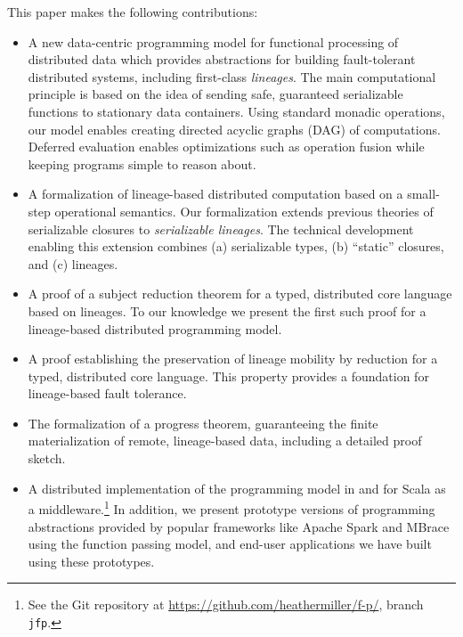 \documentclass{jfp1}
\begin{document}
This paper makes the following contributions:
\begin{itemize}
  \item A new data-centric programming model for functional processing
    of distributed data which provides abstractions for building
    fault-tolerant distributed systems, including first-class {\em
      lineages}. The main computational principle is based on the idea
    of sending safe, guaranteed serializable functions to stationary
    data containers. Using standard monadic operations, our model
    enables creating directed acyclic graphs (DAG) of
    computations. Deferred evaluation enables optimizations such as
    operation fusion while keeping programs simple to reason about.

  \item A formalization of lineage-based distributed computation based
    on a small-step operational semantics. Our formalization extends
    previous theories of serializable closures to {\em serializable
      lineages}. The technical development enabling this extension
    combines (a) serializable types, (b) ``static'' closures, and (c)
    lineages.

  \item A proof of a subject reduction theorem for a typed, distributed core
    language based on lineages. To our knowledge we present the first such proof
    for a lineage-based distributed programming model.

  \item A proof establishing the preservation of lineage mobility by reduction
    for a typed, distributed core language. This property provides a foundation
    for lineage-based fault tolerance.

  \item The formalization of a progress theorem, guaranteeing the
    finite materialization of remote, lineage-based data, including a
    detailed proof sketch.

  \item A distributed implementation of the programming model in and
    for Scala as a middleware.\footnote{See the Git repository at
      \url{https://github.com/heathermiller/f-p/}, branch
      \texttt{jfp}.} In addition, we present prototype versions of
    programming abstractions provided by popular frameworks like
    Apache Spark and MBrace using the function passing model, and
    end-user applications we have built using these prototypes.
\end{itemize}
\end{document}
